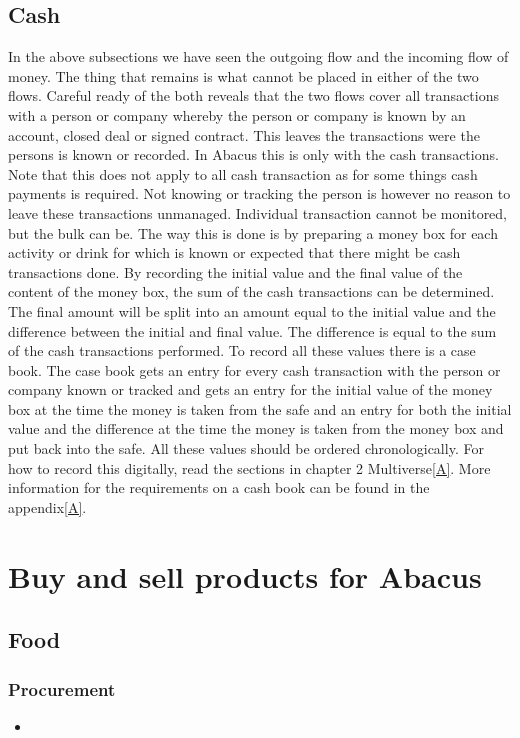 \documentclass{report}
\begin{document}
\subsection{Cash}
In the above subsections we have seen the outgoing flow and the incoming flow of money. The thing that remains is what cannot be placed in either of the two flows. Careful ready of the both reveals that the two flows cover all transactions with a person or company whereby the person or company is known by an account, closed deal or signed contract. This leaves the transactions were the persons is known or recorded. In Abacus this is only with the cash transactions. Note that this does not apply to all cash transaction as for some things cash payments is required. Not knowing or tracking the person is however no reason to leave these transactions unmanaged. Individual transaction cannot be monitored, but the bulk can be. The way this is done is by preparing a money box for each activity or drink for which is known or expected that there might be cash transactions done. By recording the initial value and the final value of the content of the money box, the sum of the cash transactions can be determined. The final amount will be split into an amount equal to the initial value and the difference between the initial and final value. The difference is equal to the sum of the cash transactions performed. To record all these values there is a case book. The case book gets an entry for every cash transaction with the person or company known or tracked and gets an entry for the initial value of the money box at the time the money is taken from the safe and an entry for both the initial value and the difference at the time the money is taken from the money box and put back into the safe. All these values should be ordered chronologically. For how to record this digitally, read the sections in chapter 2 Multiverse\ref{A}. More information for the requirements on a cash book can be found in the appendix\ref{A}.   

\section{Buy and sell products for Abacus}

\subsection{Food}

\subsubsection{Procurement}
\begin{itemize} 
\vspace{-1mm}
\itemsep-1mm 
\item 
\end{itemize}
\end{document}

